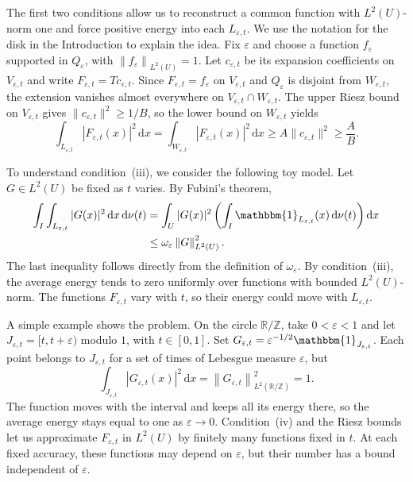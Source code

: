 \documentclass[12pt,reqno,tbtags]{amsart}
\def\R{\mathbb{R}}
\def\Z{\mathbb{Z}}
\def\d{\mathrm{d}}
\newcommand\norm[1]{\|#1\|}
\newcommand\1{\mathbbm{1}}
\newcommand\Norm[2]{\left\|#1\right\|_{#2}}
\newcommand{\eps}{\varepsilon}
\def\d{\mathrm{d}}
\begin{document}
The first two conditions allow us to reconstruct a common function with
$L^2(U)$-norm one and force positive energy into each $L_{\eps,t}$.
We use the notation for the disk in the Introduction to explain the idea.
Fix $\eps$ and choose a function $f_\eps$ supported in $Q_\eps$,
with $\Norm{f_\eps}{L^2(U)}=1$. Let $c_{\eps,t}$ be its expansion coefficients
on $V_{\eps,t}$ and write $F_{\eps,t}=Tc_{\eps,t}$.
Since $F_{\eps,t}=f_\eps$ on $V_{\eps,t}$ and $Q_\eps$ is disjoint from
$W_{\eps,t}$, the extension vanishes almost everywhere on
$V_{\eps,t}\cap W_{\eps,t}$.
The upper Riesz bound on $V_{\eps,t}$ gives $\norm{c_{\eps,t}}^2\ge1/B$,
so the lower bound on $W_{\eps,t}$ yields
\begin{equation*}
    \int_{L_{\eps,t}}|F_{\eps,t}(x)|^2\,\d x
    =\int_{W_{\eps,t}}|F_{\eps,t}(x)|^2\,\d x
    \ge A\norm{c_{\eps,t}}^2\ge\frac AB.
\end{equation*}

To understand condition~(iii), we consider the following toy model.
Let $G\in L^2(U)$ be fixed as $t$ varies. By Fubini's theorem,
\begin{equation*}
    \begin{aligned}
        \int_I\int_{L_{\eps,t}}|G(x)|^2\,\d x\,\d\nu(t)
        &=\int_U|G(x)|^2
          \left(\int_I\1_{L_{\eps,t}}(x)\,\d\nu(t)\right)\d x\\
        &\le\omega_\eps\Norm{G}{L^2(U)}^2.
    \end{aligned}
\end{equation*}
The last inequality follows directly from the definition of $\omega_\eps$.
By condition~(iii), the average energy tends to zero uniformly over functions
with bounded $L^2(U)$-norm. The functions $F_{\eps,t}$ vary with $t$, so their energy could
move with $L_{\eps,t}$.

A simple example shows the problem. On the circle $\R/\Z$, take $0<\eps<1$
and let $J_{\eps,t}=[t,t+\eps)$ modulo $1$, with $t\in[0,1]$.
Set $G_{\eps,t}=\eps^{-1/2}\1_{J_{\eps,t}}$.
Each point belongs to $J_{\eps,t}$ for a set of times of Lebesgue measure $\eps$, but
\begin{equation*}
    \int_{J_{\eps,t}}|G_{\eps,t}(x)|^2\,\d x
    =\Norm{G_{\eps,t}}{L^2(\R/\Z)}^2=1.
\end{equation*}
The function moves with the interval and keeps all its energy there, so the
average energy stays equal to one as $\eps\to0$.
Condition~(iv) and the Riesz bounds let us approximate $F_{\eps,t}$ in $L^2(U)$
by finitely many functions fixed in $t$. At each fixed accuracy, these functions
may depend on $\eps$, but their number has a bound independent of $\eps$.
\end{document}
